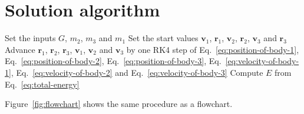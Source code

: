 \section{Solution algorithm}
\begin{algorithm}[htbp]
  \caption{Solution procedure}\label{alg:solution}
  \begin{algorithmic}[1]
    \State Set the inputs $G$, $m_2$, $m_3$ and $m_1$
    \State Set the start values $\mathbf{v}_1$, $\mathbf{r}_1$, $\mathbf{v}_2$, $\mathbf{r}_2$, $\mathbf{v}_3$ and $\mathbf{r}_3$
     
      \State Advance $\mathbf{r}_1$, $\mathbf{r}_2$, $\mathbf{r}_3$, $\mathbf{v}_1$, $\mathbf{v}_2$ and $\mathbf{v}_3$ by one RK4 step of Eq.~\eqref{eq:position-of-body-1}, Eq.~\eqref{eq:position-of-body-2}, Eq.~\eqref{eq:position-of-body-3}, Eq.~\eqref{eq:velocity-of-body-1}, Eq.~\eqref{eq:velocity-of-body-2} and Eq.~\eqref{eq:velocity-of-body-3}
    \EndFor
    \State Compute $E$ from Eq.~\eqref{eq:total-energy}
  \end{algorithmic}
\end{algorithm}

Figure~\ref{fig:flowchart} shows the same procedure as a flowchart.

